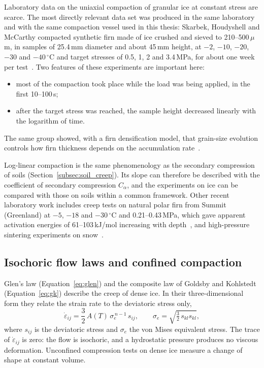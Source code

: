 Laboratory data on the uniaxial compaction of granular ice at constant stress are scarce. The most directly relevant data set was produced in the same laboratory and with the same compaction vessel used in this thesis: Skarbek, Houdyshell and McCarthy compacted synthetic firn made of ice crushed and sieved to 210--500\,$\mu$m, in samples of 25.4\,mm diameter and about 45\,mm height, at $-2$, $-10$, $-20$, $-30$ and $-40\,^\circ$C and target stresses of 0.5, 1, 2 and 3.4\,MPa, for about one week per test~\cite{skarbek2025data}. Two features of these experiments are important here:
\begin{itemize}
    \item most of the compaction took place while the load was being applied, in the first 10--100\,s;
    \item after the target stress was reached, the sample height decreased linearly with the logarithm of time.
\end{itemize}
The same group showed, with a firn densification model, that grain-size evolution controls how firn thickness depends on the accumulation rate~\cite{kingslake2022}.

Log-linear compaction is the same phenomenology as the secondary compression of soils (Section~\ref{subsec:soil_creep}). Its slope can therefore be described with the coefficient of secondary compression $C_\alpha$, and the experiments on ice can be compared with those on soils within a common framework. Other recent laboratory work includes creep tests on natural polar firn from Summit (Greenland) at $-5$, $-18$ and $-30\,^\circ$C and 0.21--0.43\,MPa, which gave apparent activation energies of 61--103\,kJ/mol increasing with depth~\cite{li2026}, and high-pressure sintering experiments on snow~\cite{hong2022}.

\subsection{Isochoric flow laws and confined compaction}
\label{subsec:compressible}

Glen's law (Equation~\eqref{eq:glen}) and the composite law of Goldsby and Kohlstedt (Equation~\eqref{eq:gk}) describe the creep of dense ice. In their three-dimensional form they relate the strain rate to the deviatoric stress only,
\begin{equation}
    \dot\varepsilon_{ij} = \frac{3}{2}\,A(T)\,\sigma_e^{\,n-1}\,s_{ij}, \qquad \sigma_e = \sqrt{\tfrac{3}{2}\,s_{kl}s_{kl}},
    \label{eq:glen3d}
\end{equation}
where $s_{ij}$ is the deviatoric stress and $\sigma_e$ the von Mises equivalent stress. The trace of $\dot\varepsilon_{ij}$ is zero: the flow is isochoric, and a hydrostatic pressure produces no viscous deformation. Unconfined compression tests on dense ice measure a change of shape at constant volume.

